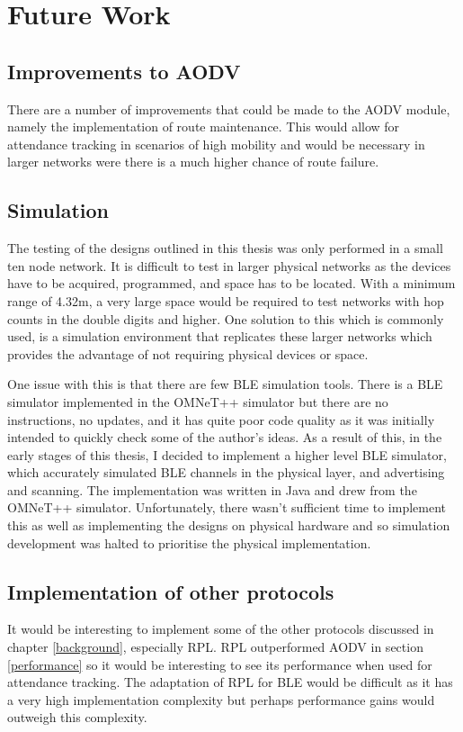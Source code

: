   \section{Future Work}
  \subsection{Improvements to AODV}
  There are a number of improvements that could be made to the AODV module, namely
  the implementation of route maintenance. This would allow for attendance tracking
  in scenarios of high mobility and would be necessary in larger networks were there
  is a much higher chance of route failure.

  \subsection{Simulation}
  The testing of the designs outlined in this thesis was only performed in a small
  ten node network. It is difficult to test in larger physical networks as the devices
  have to be acquired, programmed, and space has to be located. With a minimum range
  of 4.32m, a very large space would be required to test networks with hop counts
  in the double digits and higher. One solution to this which is commonly used, is
  a simulation environment that replicates these larger networks which provides the
  advantage of not requiring physical devices or space.

  One issue with this is that there are few BLE simulation tools. There is a
  BLE simulator \cite{ble_simulator} implemented in the OMNeT++ simulator \cite{omnet}
  but there are no instructions, no updates, and it has quite poor code quality as
  it was initially intended to quickly check some of the author's ideas. As a
  result of this, in the early stages of this thesis, I decided to implement
  a higher level BLE simulator, which accurately simulated BLE channels in the
  physical layer, and advertising and scanning. The implementation was written
  in Java and drew from the OMNeT++ simulator. Unfortunately, there wasn't sufficient
  time to implement this as well as implementing the designs on physical hardware
  and so simulation development was halted to prioritise the physical implementation.

  \subsection{Implementation of other protocols}
  It would be interesting to implement some of the other protocols discussed in
  chapter \ref{background}, especially RPL. RPL outperformed AODV in
  section \ref{performance} so it would be interesting to see its performance
  when used for attendance tracking. The adaptation of RPL for
  BLE would be difficult as it has a very high implementation complexity but perhaps
  performance gains would outweigh this complexity.
